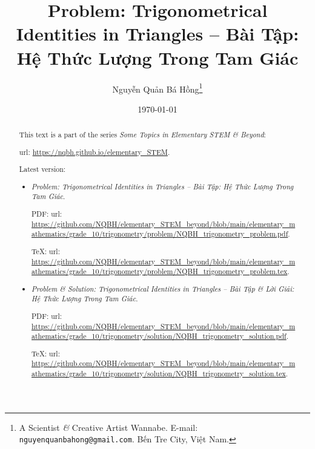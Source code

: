 \documentclass{article}
\title{Problem: Trigonometrical Identities in Triangles -- Bài Tập: Hệ Thức Lượng Trong Tam Giác}
\author{Nguyễn Quản Bá Hồng\footnote{A Scientist {\it\&} Creative Artist Wannabe. E-mail: {\tt nguyenquanbahong@gmail.com}. Bến Tre City, Việt Nam.}}
\date{\today}
\begin{document}
\maketitle
\begin{abstract}
	This text is a part of the series {\it Some Topics in Elementary STEM \& Beyond}:
	
	{\sc url}: \url{https://nqbh.github.io/elementary_STEM}.
	
	Latest version:
	\begin{itemize}
		\item {\it Problem: Trigonometrical Identities in Triangles -- Bài Tập: Hệ Thức Lượng Trong Tam Giác}.
		
		PDF: {\sc url}: \url{https://github.com/NQBH/elementary_STEM_beyond/blob/main/elementary_mathematics/grade_10/trigonometry/problem/NQBH_trigonometry_problem.pdf}.
		
		\TeX: {\sc url}: \url{https://github.com/NQBH/elementary_STEM_beyond/blob/main/elementary_mathematics/grade_10/trigonometry/problem/NQBH_trigonometry_problem.tex}.
		\item {\it Problem \& Solution: Trigonometrical Identities in Triangles -- Bài Tập \& Lời Giải: Hệ Thức Lượng Trong Tam Giác}.
		
		PDF: {\sc url}: \url{https://github.com/NQBH/elementary_STEM_beyond/blob/main/elementary_mathematics/grade_10/trigonometry/solution/NQBH_trigonometry_solution.pdf}.
		
		\TeX: {\sc url}: \url{https://github.com/NQBH/elementary_STEM_beyond/blob/main/elementary_mathematics/grade_10/trigonometry/solution/NQBH_trigonometry_solution.tex}.
	\end{itemize}
\end{abstract}
\tableofcontents

\end{document}
